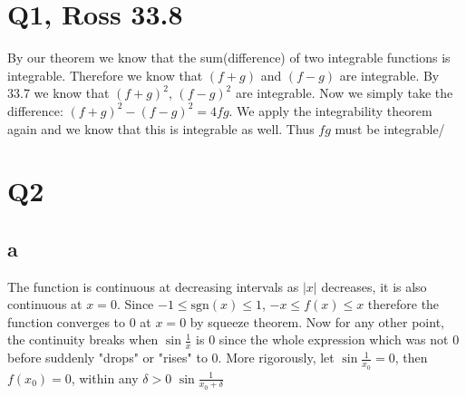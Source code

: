 \documentclass[12pt]{article}
\begin{document}
\section{Q1, Ross 33.8}
By our theorem we know that the sum(difference) of two integrable functions is integrable. Therefore we know that $(f+g)$ and $(f-g)$ are integrable. By 33.7 we know that $(f+g)^2$, $(f-g)^2$ are integrable. Now we simply take the difference: $(f+g)^2-(f-g)^2 = 4fg$. We apply the integrability theorem again and we know that this is integrable as well. Thus $fg$ must be integrable/
\newpage

\section{Q2}
\subsection{a}
The function is continuous at decreasing intervals as $|x|$ decreases, it is also continuous at $x=0$. Since $-1 \leq \text{sgn}(x) \leq 1$, $-x \leq f(x)\leq x$ therefore the function converges to $0$ at $x=0$ by squeeze theorem.
\newline
Now for any other point, the continuity breaks when $\sin \frac{1}{x}$ is 0 since the whole expression which was not 0 before suddenly "drops" or "rises" to 0. More rigorously, let $\sin \frac{1}{x_0} = 0$,
then $f(x_0)=0$, within any $\delta > 0$ $\sin \frac{1}{x_0+\delta}$
\end{document}

